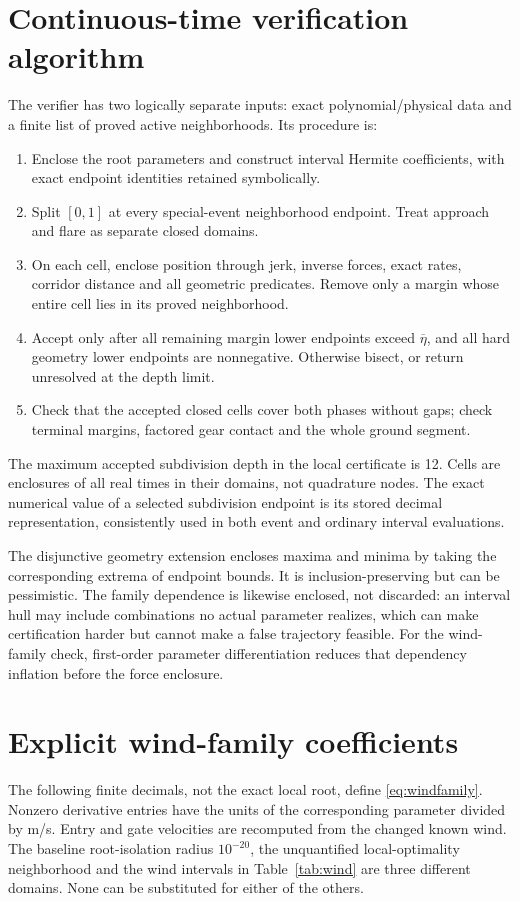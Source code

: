 \section{Continuous-time verification algorithm}\label{app:algorithm}
The verifier has two logically separate inputs: exact polynomial/physical data and a finite list of proved active neighborhoods. Its procedure is:
\begin{enumerate}
\item Enclose the root parameters and construct interval Hermite coefficients, with exact endpoint identities retained symbolically.
\item Split $[0,1]$ at every special-event neighborhood endpoint. Treat approach and flare as separate closed domains.
\item On each cell, enclose position through jerk, inverse forces, exact rates, corridor distance and all geometric predicates. Remove only a margin whose entire cell lies in its proved neighborhood.
\item Accept only after all remaining margin lower endpoints exceed $\overline\eta$, and all hard geometry lower endpoints are nonnegative. Otherwise bisect, or return unresolved at the depth limit.
\item Check that the accepted closed cells cover both phases without gaps; check terminal margins, factored gear contact and the whole ground segment.
\end{enumerate}
The maximum accepted subdivision depth in the local certificate is 12. Cells are enclosures of all real times in their domains, not quadrature nodes. The exact numerical value of a selected subdivision endpoint is its stored decimal representation, consistently used in both event and ordinary interval evaluations.

The disjunctive geometry extension encloses maxima and minima by taking the corresponding extrema of endpoint bounds. It is inclusion-preserving but can be pessimistic. The family dependence is likewise enclosed, not discarded: an interval hull may include combinations no actual parameter realizes, which can make certification harder but cannot make a false trajectory feasible. For the wind-family check, first-order parameter differentiation reduces that dependency inflation before the force enclosure.

\section{Explicit wind-family coefficients}\label{app:wind}
The following finite decimals, not the exact local root, define \eqref{eq:windfamily}. Nonzero derivative entries have the units of the corresponding parameter divided by m/s. Entry and gate velocities are recomputed from the changed known wind.
\FloatBarrier
The baseline root-isolation radius $10^{-20}$, the unquantified local-optimality neighborhood and the wind intervals in Table~\ref{tab:wind} are three different domains. None can be substituted for either of the others.

